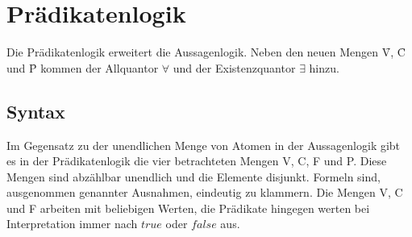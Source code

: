 \newcommand{\INT}{\mathcal{I}}
\newcommand{\ZUW}{\mathcal{Z}}
\newcommand{\FM}{\mathcal{T}}

\section{Prädikatenlogik}
Die Prädikatenlogik erweitert die Aussagenlogik. Neben den neuen Mengen \f{V}, \f{C} und \f{P} kommen der Allquantor $\forall$ und der Existenzquantor $\exists$ hinzu. 
\subsection{Syntax}
    Im Gegensatz zu der unendlichen Menge von Atomen in der Aussagenlogik gibt es in der Prädikatenlogik die vier betrachteten Mengen V, C, F und P. Diese Mengen sind abzählbar unendlich und die Elemente disjunkt. Formeln sind, ausgenommen genannter Ausnahmen, eindeutig zu klammern. Die Mengen V, C und F arbeiten mit beliebigen Werten, die Prädikate hingegen werten bei Interpretation immer nach $true$ oder $false$ aus. 
